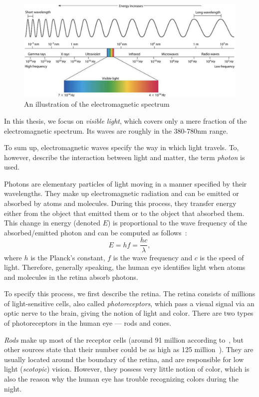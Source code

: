 \begin{figure}[t]
	\centering
	\includegraphics[width=0.9\linewidth]{img/electromagnetic_spectrum.png}
	\caption{An illustration of the electromagnetic spectrum~\cite{electromagneticSpectrum}} \label{fig:electromagneticSpectrum}
\end{figure}

In this thesis, we focus on \emph{visible light}, which covers only a mere fraction of the electromagnetic spectrum. Its waves are roughly in the 380-780nm range.

To sum up, electromagnetic waves specify the way in which light travels. To, however, describe the interaction between light and matter, the term \emph{photon} is used.

Photons are elementary particles of light moving in a manner specified by their wavelengths. They make up electromagnetic radiation and can be emitted or absorbed by atoms and molecules. During this process, they transfer energy either from the object that emitted them or to the object that absorbed them. This change in energy (denoted $E$) is proportional to the wave frequency of the absorbed/emitted photon and can be computed as follows~\cite{planckConstant}: 
\begin{equation} \label{energyEquation}
E = hf = \dfrac{hc}{\lambda},
\end{equation}
where $h$ is the Planck's constant, $f$ is the wave frequency and $c$ is the speed of light. Therefore, generally speaking, the human eye identifies light when atoms and molecules in the retina absorb photons. 

To specify this process, we first describe the retina. The retina consists of millions of light-sensitive cells, also called \emph{photoreceptors}, which pass a visual signal via an optic nerve to the brain, giving the notion of light and color. There are two types of photoreceptors in the human eye --- rods and cones.

\emph{Rods} make up most of the receptor cells (around 91 million according to~\citet{rods91cones4f5}, but other sources state that their number could be as high as 125 million~\cite{rods125cones6}). They are usually located around the boundary of the retina, and are responsible for low light (\emph{scotopic}) vision. However, they possess very little notion of color, which is also the reason why the human eye has trouble recognizing colors during the night.

